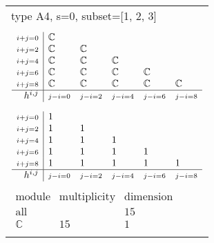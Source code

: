 \documentclass[crop,border=2mm]{standalone}
\begin{document}
\begin{tabular}{l}
{\huge type A4, s=0, subset=[1, 2, 3]}\\ \\


$\displaystyle
\begin{array}{r|l l l l l}
	{\scriptstyle i+j=0}&\mathbb{C}&&&&\\
	{\scriptstyle i+j=2}&\mathbb{C}&\mathbb{C}&&&\\
	{\scriptstyle i+j=4}&\mathbb{C}&\mathbb{C}&\mathbb{C}&&\\
	{\scriptstyle i+j=6}&\mathbb{C}&\mathbb{C}&\mathbb{C}&\mathbb{C}&\\
	{\scriptstyle i+j=8}&\mathbb{C}&\mathbb{C}&\mathbb{C}&\mathbb{C}&\mathbb{C}\\
	\hline h^{i,j}&{\scriptstyle j-i=0}&{\scriptstyle j-i=2}&{\scriptstyle j-i=4}&{\scriptstyle j-i=6}&{\scriptstyle j-i=8}
\end{array}
$ \\ \\


$\displaystyle
\begin{array}{r|l l l l l}
	{\scriptstyle i+j=0}&1&&&&\\
	{\scriptstyle i+j=2}&1&1&&&\\
	{\scriptstyle i+j=4}&1&1&1&&\\
	{\scriptstyle i+j=6}&1&1&1&1&\\
	{\scriptstyle i+j=8}&1&1&1&1&1\\
	\hline h^{i,j}&{\scriptstyle j-i=0}&{\scriptstyle j-i=2}&{\scriptstyle j-i=4}&{\scriptstyle j-i=6}&{\scriptstyle j-i=8}
\end{array}
$ \\ \\


$\displaystyle
\begin{array}{rll}
	\text{module}&\text{multiplicity}&\text{dimension} \\ \hline \text{all}&&15 \\
	\mathbb{C}&15&1
\end{array}
$ \\ \\

\end{tabular}
\end{document}
